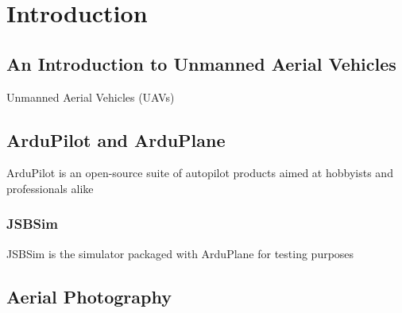 
\chapter{Introduction}  %
\label{intro}

\ifpdf
    \graphicspath{{Chapter1/Figs/Raster/}{Chapter1/Figs/PDF/}{Chapter1/Figs/}}
\else
    \graphicspath{{Chapter1/Figs/Vector/}{Chapter1/Figs/}}
\fi


\section{An Introduction to Unmanned Aerial Vehicles} %
\label{intro:UAVs}

Unmanned Aerial Vehicles (UAVs) 


\section{ArduPilot and ArduPlane} %
\label{intro:arduplane}

ArduPilot is an open-source suite of autopilot products aimed at hobbyists and professionals alike 

\subsection{JSBSim}
\label{intro:jsbsim}

JSBSim is the simulator packaged with ArduPlane for testing purposes


\section{Aerial Photography}  %
\label{intro:photography}

